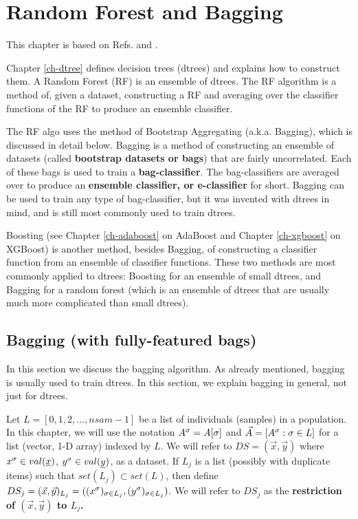 \chapter{Random Forest and Bagging}
\label{ch-rforest}


This chapter
is based on Refs.\cite{wiki-bagging}
and \cite{wiki-rforest}.

Chapter \ref{ch-dtree}
defines decision trees (dtrees)
and explains how to construct them.
A Random Forest (RF) is 
an ensemble
of dtrees.
The RF algorithm is a
method of,
given a dataset,
constructing a RF
and averaging
over the classifier 
functions of the RF
to produce
an ensemble classifier.


The RF algo
uses  the method of 
Bootstrap Aggregating
(a.k.a. Bagging), which
is discussed in detail below.
Bagging
is a method
of constructing
an ensemble
of datasets (called {\bf bootstrap
datasets or bags})
that are 
fairly uncorrelated.
Each of
these bags is used to
train a {\bf bag-classifier}.
The bag-classifiers
are averaged over
to produce an {\bf
ensemble classifier,
or e-classifier} for short.
Bagging can be used
to
train any type
of bag-classifier,
but it was 
invented with
dtrees
in mind, 
and is still
 most commonly
used to train dtrees.

Boosting
(see Chapter \ref{ch-adaboost} on AdaBoost
and
Chapter \ref{ch-xgboost} on XGBoost)
is
another method,
besides Bagging,
of constructing a classifier function
from an ensemble 
of classifier functions.
These two methods are most commonly
applied to dtrees: Boosting for an ensemble of
small dtrees, and Bagging for a
random forest (which
is an ensemble
of dtrees that are 
usually much more
complicated than small dtrees).



\section{Bagging (with fully-featured bags)}
In this section
we discuss the bagging
algorithm.
As already 
mentioned,
bagging
is usually
used to train dtrees.
In this
section,
we explain bagging
in general,
not just for dtrees.


Let $L=[0,1,2, \ldots, nsam-1]$ be a list of
individuals (samples) in a population.
In this chapter, we will use the notation 
$A^\sigma=A[\sigma]$ 
and $\vec{A}=[A^\sigma:\sigma\in L]$
for a  list (vector, 1-D  array) indexed by $L$.
We will refer to $DS=(\vec{x}, \vec{y})$ 
where $x^\s\in val(\rvx)$, $y^\s\in val(\rvy)$,
as a dataset. If
$L_j$ is a list (possibly with 
duplicate items)
such that $set(L_j)\subset set(L)$,
 then
define
$DS_j=(\vec{x}, \vec{y})_{L_j}=
((x^\sigma)_{\sigma\in L_j}, 
(y^\sigma)_{\sigma\in L_j})$.
We will
refer to $DS_j$
as the {\bf restriction of 
$(\vec{x}, \vec{y})$ to $L_j$.}




